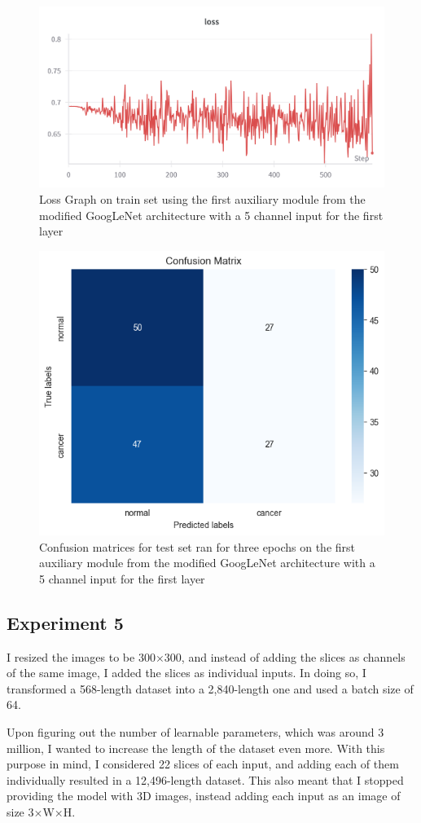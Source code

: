 \begin{figure}[!ht]
    \centering
    \includegraphics[width=0.75\linewidth]{figures/Figure17.png}
    \caption{Loss Graph on train set using the first auxiliary module from the modified GoogLeNet architecture with a 5 channel input for the first layer}
    \label{fig:fig16}
\end{figure}

\begin{figure}[ht]
    \centering
    \includegraphics[width=0.45\linewidth]{figures/Figure18.png}
    \caption{Confusion matrices for test set ran for three epochs on the first auxiliary module from the modified GoogLeNet architecture with a 5 channel input for the first layer}
    \label{fig:fig17}
\end{figure}

\subsection{Experiment 5}

I resized the images to be 300$\times$300, and instead of adding the slices as channels of the same image, I added the slices as individual inputs. In doing so, I transformed a 568-length dataset into a 2,840-length one and used a batch size of 64.

Upon figuring out the number of learnable parameters, which was around 3 million, I wanted to increase the length of the dataset even more. With this purpose in mind, I considered 22 slices of each input, and adding each of them individually resulted in a 12,496-length dataset. This also meant that I stopped providing the model with 3D images, instead adding each input as an image of size 3$\times$W$\times$H.

